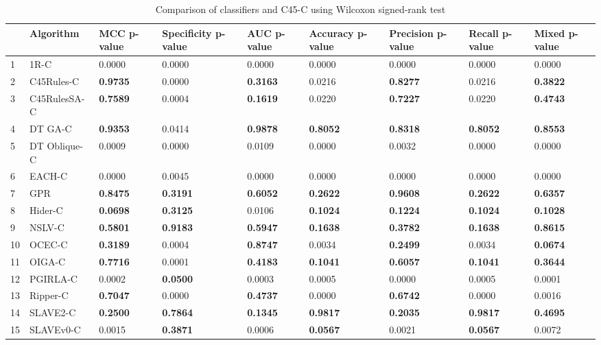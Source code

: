 \begin{table}
\footnotesize
\caption{Comparison of classifiers and C45-C using Wilcoxon signed-rank test}
\label{tab:wilcoxon comparison}
\begin{tabular}{lllllllll}
\hline
 & Algorithm & MCC p-value & Specificity p-value & AUC p-value & Accuracy p-value & Precision p-value & Recall p-value & Mixed p-value \\
\hline
1 & 1R-C & 0.0000 & 0.0000 & 0.0000 & 0.0000 & 0.0000 & 0.0000 & 0.0000 \\
2 & C45Rules-C & \textbf{0.9735} & 0.0000 & \textbf{0.3163} & 0.0216 & \textbf{0.8277} & 0.0216 & \textbf{0.3822} \\
3 & C45RulesSA-C & \textbf{0.7589} & 0.0004 & \textbf{0.1619} & 0.0220 & \textbf{0.7227} & 0.0220 & \textbf{0.4743} \\
4 & DT GA-C & \textbf{0.9353} & 0.0414 & \textbf{0.9878} & \textbf{0.8052} & \textbf{0.8318} & \textbf{0.8052} & \textbf{0.8553} \\
5 & DT Oblique-C & 0.0009 & 0.0000 & 0.0109 & 0.0000 & 0.0032 & 0.0000 & 0.0000 \\
6 & EACH-C & 0.0000 & 0.0045 & 0.0000 & 0.0000 & 0.0000 & 0.0000 & 0.0000 \\
7 & GPR & \textbf{0.8475} & \textbf{0.3191} & \textbf{0.6052} & \textbf{0.2622} & \textbf{0.9608} & \textbf{0.2622} & \textbf{0.6357} \\
8 & Hider-C & \textbf{0.0698} & \textbf{0.3125} & 0.0106 & \textbf{0.1024} & \textbf{0.1224} & \textbf{0.1024} & \textbf{0.1028} \\
9 & NSLV-C & \textbf{0.5801} & \textbf{0.9183} & \textbf{0.5947} & \textbf{0.1638} & \textbf{0.3782} & \textbf{0.1638} & \textbf{0.8615} \\
10 & OCEC-C & \textbf{0.3189} & 0.0004 & \textbf{0.8747} & 0.0034 & \textbf{0.2499} & 0.0034 & \textbf{0.0674} \\
11 & OIGA-C & \textbf{0.7716} & 0.0001 & \textbf{0.4183} & \textbf{0.1041} & \textbf{0.6057} & \textbf{0.1041} & \textbf{0.3644} \\
12 & PGIRLA-C & 0.0002 & \textbf{0.0500} & 0.0003 & 0.0005 & 0.0000 & 0.0005 & 0.0001 \\
13 & Ripper-C & \textbf{0.7047} & 0.0000 & \textbf{0.4737} & 0.0000 & \textbf{0.6742} & 0.0000 & 0.0016 \\
14 & SLAVE2-C & \textbf{0.2500} & \textbf{0.7864} & \textbf{0.1345} & \textbf{0.9817} & \textbf{0.2035} & \textbf{0.9817} & \textbf{0.4695} \\
15 & SLAVEv0-C & 0.0015 & \textbf{0.3871} & 0.0006 & \textbf{0.0567} & 0.0021 & \textbf{0.0567} & 0.0072 \\
\hline
\end{tabular}
\end{table}
